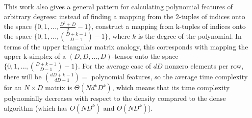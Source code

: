 \documentclass[11pt,twocolumn]{article}
\begin{document}
This work also gives a general pattern for calculating polynomial features of arbitrary degrees:
instead of finding a mapping from the 2-tuples of indices onto the space $\{0, 1, ..., \frac{D^2+D}{2}-1\}$,
construct a mapping from k-tuples of indices onto the space $\{0, 1, ..., \binom{D+k-1}{D-1}-1\}$, where $k$ is the degree of the polynomial.
In terms of the upper triangular matrix analogy, this corresponds with mapping the upper k-simplex of a $(D, D, ..., D)$-tensor onto
the space $\{0, 1, ..., \binom{D+k-1}{D-1}-1\}$. For the average case of $dD$ nonzero elements per row, 
there will be $\binom{dD+k-1}{dD-1} = $ polynomial features, so the average time complexity for an $N \times D$ matrix
is $\Theta(Nd^kD^k)$, which means that its time complexity polynomially decreases with respect to the density
compared to the dense algorithm (which has $O(ND^k)$ and $\Theta(ND^k)$).

\vskip 0.2in
{}

\end{document}

